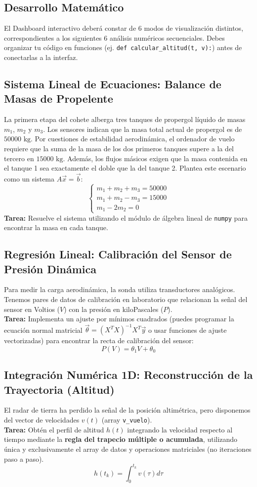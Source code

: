 	\subsection*{Desarrollo Matemático}
	
	El Dashboard interactivo deberá constar de 6 modos de visualización distintos, correspondientes a los siguientes 6 análisis numéricos secuenciales. Debes organizar tu código en funciones (ej. \texttt{def calcular\_altitud(t, v):}) antes de conectarlas a la interfaz.
	
	\subsection*{Sistema Lineal de Ecuaciones: Balance de Masas de Propelente}
	La primera etapa del cohete alberga tres tanques de propergol líquido de masas $m_1$, $m_2$ y $m_3$. Los sensores indican que la masa total actual de propergol es de $50000 \text{ kg}$. Por cuestiones de estabilidad aerodinámica, el ordenador de vuelo requiere que la suma de la masa de los dos primeros tanques supere a la del tercero en $15000 \text{ kg}$. Además, los flujos másicos exigen que la masa contenida en el tanque 1 sea exactamente el doble que la del tanque 2.
	Plantea este escenario como un sistema $A \vec{x} = \vec{b}$:
	\[
	\begin{cases}
		m_1 + m_2 + m_3 = 50000 \\
		m_1 + m_2 - m_3 = 15000 \\
		m_1 - 2 m_2 = 0
	\end{cases}
	\]
	\textbf{Tarea:} Resuelve el sistema utilizando el módulo de álgebra lineal de \texttt{numpy} para encontrar la masa en cada tanque.
	
	\subsection*{Regresión Lineal: Calibración del Sensor de Presión Dinámica}
	Para medir la carga aerodinámica, la sonda utiliza transductores analógicos. Tenemos pares de datos de calibración en laboratorio que relacionan la señal del sensor en Voltios ($V$) con la presión en kiloPascales ($P$).\\
	\textbf{Tarea:} Implementa un ajuste por mínimos cuadrados (puedes programar la ecuación normal matricial $\vec{\theta} = (X^T X)^{-1} X^T \vec{y}$ o usar funciones de ajuste vectorizadas) para encontrar la recta de calibración del sensor: 
	\[ P(V) = \theta_1 V + \theta_0 \]
	
	\subsection*{Integración Numérica 1D: Reconstrucción de la Trayectoria (Altitud)}
	El radar de tierra ha perdido la señal de la posición altimétrica, pero disponemos del vector de velocidades $v(t)$ (array \texttt{v\_vuelo}).\\
	\textbf{Tarea:} Obtén el perfil de altitud $h(t)$ integrando la velocidad respecto al tiempo mediante la \textbf{regla del trapecio múltiple o acumulada}, utilizando única y exclusivamente el array de datos y operaciones matriciales (no iteraciones paso a paso).
	\[ h(t_k) = \int_{0}^{t_k} v(\tau) d\tau \]
	
